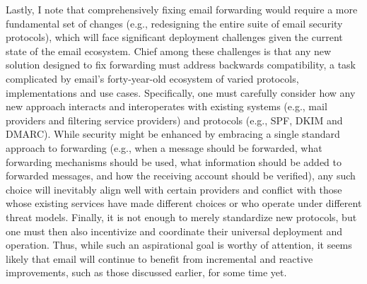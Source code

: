 Lastly, I note that comprehensively fixing email forwarding would
require a more fundamental set of changes (e.g., redesigning the
entire suite of email security protocols), which will face significant
deployment challenges given the current state of the email ecosystem.
Chief among these challenges is that any new solution designed to fix
forwarding must address backwards compatibility, a task complicated by
email's forty-year-old ecosystem of varied protocols, implementations
and use cases.  Specifically, one must carefully consider how any new
approach interacts and interoperates with existing systems (e.g., mail
providers and filtering service providers) and protocols (e.g., SPF,
DKIM and DMARC).  While security might be enhanced by embracing a
single standard approach to forwarding (e.g., when a message
should be forwarded, what forwarding mechanisms should be used, what
information should be added to forwarded messages, and how the
receiving account should be verified), any such choice will inevitably
  align well with certain providers and conflict with those whose
  existing services have made different choices or who operate under
  different threat models.  Finally, it is not enough to merely
  standardize new protocols, but one must then also incentivize and
  coordinate their universal deployment and operation.  Thus, while
  such an aspirational goal is worthy of attention, it seems likely
  that email will continue to benefit from incremental and reactive
  improvements, such as those discussed earlier, for some time yet.
